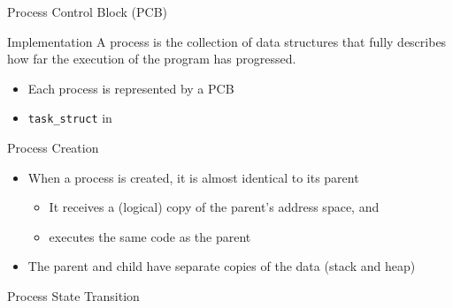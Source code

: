 \begin{frame}{Process Control Block (PCB)}
  \begin{varwidth}{.7\textwidth}
    \begin{block}{Implementation}
        A process is \alert{the collection of data structures} that fully describes how far
        the execution of the program has progressed.
        \begin{itemize}
        \item Each process is represented by a \alert{PCB}
        \item \texttt{task\_struct} in \linux{}
        \end{itemize}
      \end{block}
    \end{varwidth}\quad
    \begin{varwidth}{.2\textwidth}
      \begin{center}
      \end{center}      
    \end{varwidth}
\end{frame}

\begin{frame}{Process Creation}
  \begin{center}
  \end{center}
  \begin{itemize}
  \item When a process is created, it is almost identical to its parent
    \begin{itemize}
    \item It receives a (logical) copy of the parent's address space, and
    \item executes the same code as the parent
    \end{itemize}
  \item The parent and child have separate copies of the data (stack and heap)
  \end{itemize}
\end{frame}

\begin{frame}{Process State Transition}
  \begin{center}
  \end{center}
\end{frame}

